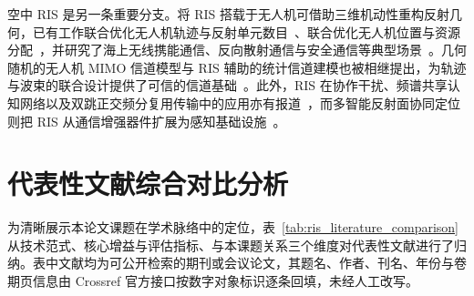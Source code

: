空中 RIS 是另一条重要分支。将 RIS 搭载于无人机可借助三维机动性重构反射几何，已有工作联合优化无人机轨迹与反射单元数目~\cite{zhao2026ris}、联合优化无人机位置与资源分配~\cite{nguyen2022ris}，并研究了海上无线携能通信、反向散射通信与安全通信等典型场景~\cite{yuan2025ris,wang2023ris,ye2024ris,sun2021ris}。几何随机的无人机 MIMO 信道模型与 RIS 辅助的统计信道建模也被相继提出，为轨迹与波束的联合设计提供了可信的信道基础~\cite{wang2024ris}。此外，RIS 在协作干扰、频谱共享认知网络以及双跳正交频分复用传输中的应用亦有报道~\cite{peng2023ris,srivastava2025ris,pradhan2020ris}，而多智能反射面协同定位则把 RIS 从通信增强器件扩展为感知基础设施~\cite{ghermezchesh2023ris}。

\section{代表性文献综合对比分析}

为清晰展示本论文课题在学术脉络中的定位，表~\ref{tab:ris_literature_comparison} 从技术范式、核心增益与评估指标、与本课题关系三个维度对代表性文献进行了归纳。表中文献均为可公开检索的期刊或会议论文，其题名、作者、刊名、年份与卷期页信息由 Crossref 官方接口按数字对象标识逐条回填，未经人工改写。

